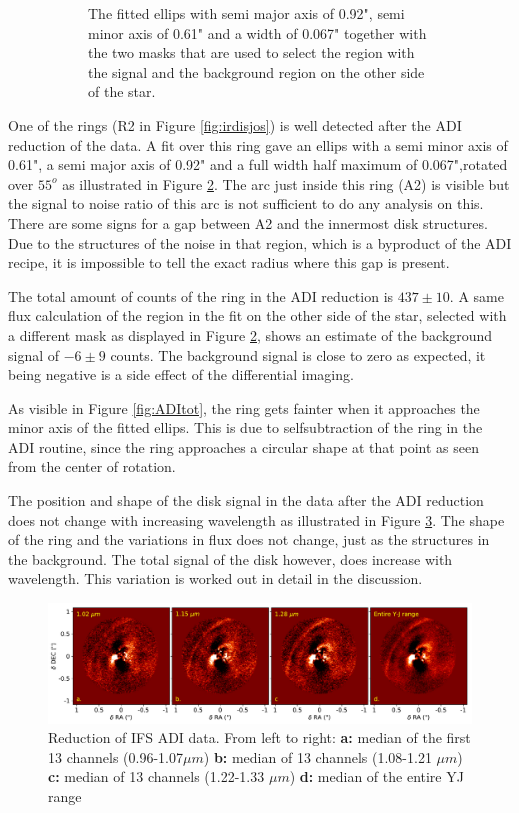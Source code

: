 \documentclass[twoside,single]{lion-msc}
\begin{document}
\begin{figure}[!b]
\begin{subfigure}{.48\textwidth}
  \caption{The fitted ellips with semi major axis of 0.92", semi minor axis of 0.61" and a width of 0.067" together with the two masks that are used to select the region with the signal and the background region on the other side of the star.}
  \label{fig:ADIfit}
\end{subfigure}
\caption{}
\end{figure}

One of the rings (R2 in Figure \ref{fig:irdisjos}) is well detected after the ADI reduction of the data. A fit over this ring gave an ellips with a semi minor axis of 0.61", a semi major axis of 0.92" and a full width half maximum of 0.067",rotated over $55^o$ as illustrated in Figure \ref{fig:ADIfit}. The arc just inside this ring (A2) is visible but the signal to noise ratio of this arc is not sufficient to do any analysis on this. There are some signs for a gap between A2 and the innermost disk structures. Due to the structures of the noise in that region, which is a byproduct of the ADI recipe, it is impossible to tell the exact radius where this gap is present.
\bigskip

The total amount of counts of the ring in the ADI reduction is $437\pm 10$. A same flux calculation of the region in the fit on the other side of the star, selected with a different mask as displayed in Figure \ref{fig:ADIfit}, shows an estimate of the background signal of $-6\pm 9$ counts. The background signal is close to zero as expected, it being negative is a side effect of the differential imaging. 
\bigskip

As visible in Figure \ref{fig:ADItot}, the ring gets fainter when it approaches the minor axis of the fitted ellips. This is due to selfsubtraction of the ring in the ADI routine, since the ring approaches a circular shape at that point as seen from the center of rotation.
\bigskip

The position and shape of the disk signal in the data after the ADI reduction does not change with increasing wavelength as illustrated in Figure \ref{fig:ADIcolor}. The shape of the ring and the variations in flux does not change, just as the structures in the background. The total signal of the disk however, does increase with wavelength. This variation is worked out in detail in the discussion.

\begin{figure}[htb]
\centering
\includegraphics[trim={0cm 0cm 0cm 0cm},clip,width = \textwidth]{ADIwavelplot}
\caption{Reduction of IFS ADI data. From left to right: \textbf{a:} median of the first 13 channels (0.96-1.07$\mu m$) \textbf{b:} median of 13 channels (1.08-1.21 $\mu m$) \textbf{c:} median of 13 channels (1.22-1.33 $\mu m$) \textbf{d:} median of the entire YJ range}
\label{fig:ADIcolor}
\end{figure}
\end{document}
